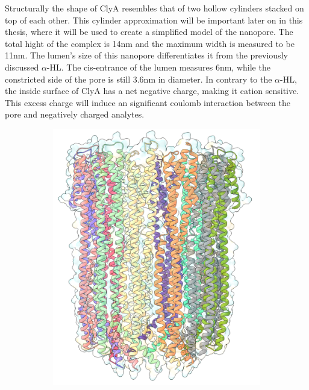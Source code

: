 Structurally the shape of ClyA resembles that of two hollow cylinders stacked on top of
each other. This cylinder approximation will be important later on in this thesis, where
it will be used to create a simplified model of the nanopore. The total hight of the
complex is 14nm and the maximum width is measured to be 11nm. The lumen's size of this
nanopore differentiates it from the previously discussed $\alpha$-HL. The cis-entrance of
the lumen measures 6nm, while the constricted side of the pore is still 3.6nm in
diameter.  In contrary to the $\alpha$-HL, the inside surface of ClyA has a net negative
charge, making it cation sensitive. This excess charge will induce an significant coulomb
interaction between the pore and negatively charged analytes.
\begin{figure}[ht]
  \begin{centering}
  \begin{subfigure}[t]{\dimexpr.4\linewidth-1.3em\relax}
  \centering
  \includegraphics[width=\linewidth,valign=t]{Figures/clya-front-c.png}

\end{subfigure}
\end{centering}
\end{figure}
